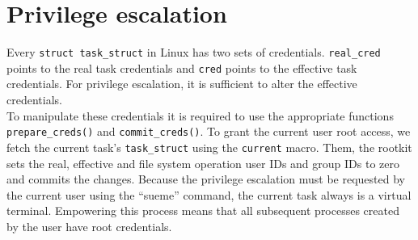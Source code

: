 \section{Privilege escalation}
Every \texttt{struct task\_struct} in Linux has two sets of credentials. 
\texttt{real\_cred} points to the real task credentials and \texttt{cred} points 
to the effective task credentials. For privilege escalation, it is sufficient to 
alter the effective credentials.\\
To manipulate these credentials it is required to use the appropriate functions 
\texttt{prepare\_creds()} and \texttt{commit\_creds()}.
To grant the current user root access, we fetch the current task's 
\texttt{task\_struct} using the \texttt{current} macro. Them, the rootkit sets 
the real, effective and file system operation user IDs and group IDs to zero 
and commits the changes. Because the privilege escalation must be requested by 
the current user using the ``sueme'' command, the current task always is a 
virtual terminal. Empowering this process means that all subsequent processes 
created by the user have root credentials.
